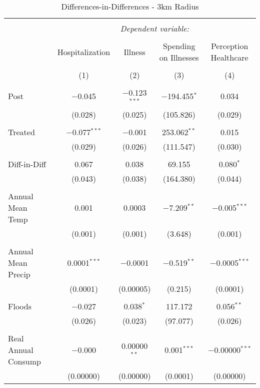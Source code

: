 
\begin{table}[!htbp] \centering 
  \caption{Differences-in-Differences - 3km Radius} 
  \label{} 
\begin{tabular}{@{\extracolsep{5pt}}lcccc} 
\\[-1.8ex]\hline 
\hline \\[-1.8ex] 
 & \multicolumn{4}{c}{\textit{Dependent variable:}} \\ 
\cline{2-5} 
\\[-1.8ex] & Hospitalization & Illness & Spending on Illnesses & Perception Healthcare \\ 
\\[-1.8ex] & (1) & (2) & (3) & (4)\\ 
\hline \\[-1.8ex] 
 Post & $-$0.045 & $-$0.123$^{***}$ & $-$194.455$^{*}$ & 0.034 \\ 
  & (0.028) & (0.025) & (105.826) & (0.029) \\ 
  & & & & \\ 
 Treated & $-$0.077$^{***}$ & $-$0.001 & 253.062$^{**}$ & 0.015 \\ 
  & (0.029) & (0.026) & (111.547) & (0.030) \\ 
  & & & & \\ 
 Diff-in-Diff & 0.067 & 0.038 & 69.155 & 0.080$^{*}$ \\ 
  & (0.043) & (0.038) & (164.380) & (0.044) \\ 
  & & & & \\ 
 Annual Mean Temp & 0.001 & 0.0003 & $-$7.209$^{**}$ & $-$0.005$^{***}$ \\ 
  & (0.001) & (0.001) & (3.648) & (0.001) \\ 
  & & & & \\ 
 Annual Mean Precip & 0.0001$^{***}$ & $-$0.0001 & $-$0.519$^{**}$ & $-$0.0005$^{***}$ \\ 
  & (0.0001) & (0.00005) & (0.215) & (0.0001) \\ 
  & & & & \\ 
 Floods & $-$0.027 & 0.038$^{*}$ & 117.172 & 0.056$^{**}$ \\ 
  & (0.026) & (0.023) & (97.077) & (0.026) \\ 
  & & & & \\ 
 Real Annual Consump & $-$0.000 & 0.00000$^{**}$ & 0.001$^{***}$ & $-$0.00000$^{***}$ \\ 
  & (0.00000) & (0.00000) & (0.0001) & (0.00000) \\ 

\end{tabular}
\end{table}
